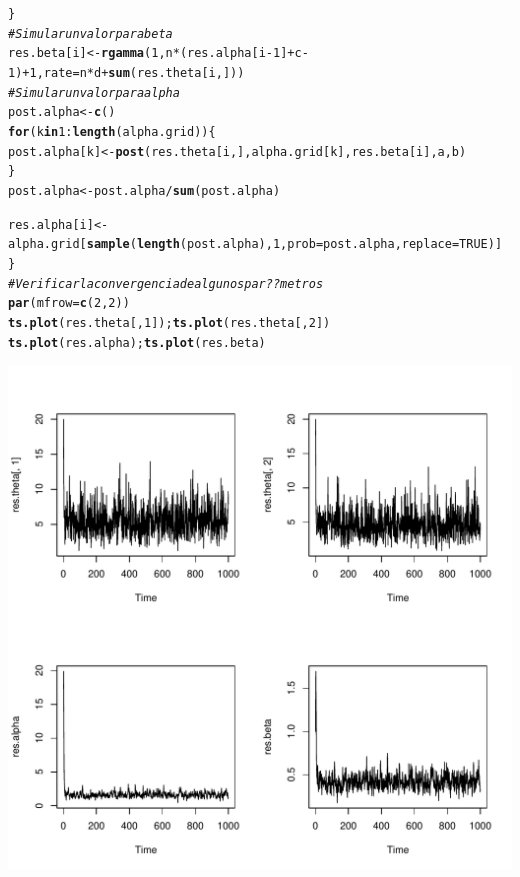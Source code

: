 \documentclass[10pt,openright]{book}\usepackage[]{graphicx}\usepackage[]{color}
\makeatletter
\def\maxwidth{ %
  \ifdim\Gin@nat@width>\linewidth
    \linewidth
  \else
    \Gin@nat@width
  \fi
}
\newcommand{\hlnum}[1]{\textcolor[rgb]{0.686,0.059,0.569}{#1}}%
\newcommand{\hlcom}[1]{\textcolor[rgb]{0.678,0.584,0.686}{\textit{#1}}}%
\newcommand{\hlopt}[1]{\textcolor[rgb]{0,0,0}{#1}}%
\newcommand{\hlstd}[1]{\textcolor[rgb]{0.345,0.345,0.345}{#1}}%
\newcommand{\hlkwa}[1]{\textcolor[rgb]{0.161,0.373,0.58}{\textbf{#1}}}%
\newcommand{\hlkwb}[1]{\textcolor[rgb]{0.69,0.353,0.396}{#1}}%
\newcommand{\hlkwc}[1]{\textcolor[rgb]{0.333,0.667,0.333}{#1}}%
\newcommand{\hlkwd}[1]{\textcolor[rgb]{0.737,0.353,0.396}{\textbf{#1}}}%
\newenvironment{kframe}{%
 \def\at@end@of@kframe{}%
 \ifinner\ifhmode%
  \def\at@end@of@kframe{\end{minipage}}%
  \begin{minipage}{\columnwidth}%
 \fi\fi%
 \def\FrameCommand##1{\hskip\@totalleftmargin \hskip-\fboxsep
 \colorbox{shadecolor}{##1}\hskip-\fboxsep
     \hskip-\linewidth \hskip-\@totalleftmargin \hskip\columnwidth}%
 \MakeFramed {\advance\hsize-\width
   \@totalleftmargin\z@ \linewidth\hsize
   \@setminipage}}%
 {\par\unskip\endMakeFramed%
 \at@end@of@kframe}
\newenvironment{knitrout}{}{} %
\makeatother
\begin{document}
\begin{knitrout}
\begin{kframe}
\begin{alltt}
   \hlstd{\}}
 \hlcom{# Simular un valor para beta}
   \hlstd{res.beta[i]} \hlkwb{<-} \hlkwd{rgamma}\hlstd{(}\hlnum{1}\hlstd{, n}\hlopt{*}\hlstd{(res.alpha[i}\hlopt{-}\hlnum{1}\hlstd{]}\hlopt{+}\hlstd{c}\hlopt{-}\hlnum{1}\hlstd{)}\hlopt{+}\hlnum{1}\hlstd{,} \hlkwc{rate}\hlstd{=n}\hlopt{*}\hlstd{d}\hlopt{+}\hlkwd{sum}\hlstd{(res.theta[i,]))}
 \hlcom{# Simular un valor para alpha}
 \hlstd{post.alpha} \hlkwb{<-} \hlkwd{c}\hlstd{()}
 \hlkwa{for}\hlstd{(k} \hlkwa{in} \hlnum{1}\hlopt{:}\hlkwd{length}\hlstd{(alpha.grid))\{}
  \hlstd{post.alpha[k]} \hlkwb{<-} \hlkwd{post}\hlstd{(res.theta[i,],alpha.grid[k],res.beta[i],a,b)}
 \hlstd{\}}
 \hlstd{post.alpha} \hlkwb{<-} \hlstd{post.alpha}\hlopt{/}\hlkwd{sum}\hlstd{(post.alpha)}

 \hlstd{res.alpha[i]} \hlkwb{<-} \hlstd{alpha.grid[}\hlkwd{sample}\hlstd{(}\hlkwd{length}\hlstd{(post.alpha),} \hlnum{1}\hlstd{,} \hlkwc{prob}\hlstd{=post.alpha,} \hlkwc{replace}\hlstd{=}\hlnum{TRUE}\hlstd{)]}
 \hlstd{\}}
 \hlcom{# Verificar la convergencia de algunos par??metros}
 \hlkwd{par}\hlstd{(}\hlkwc{mfrow}\hlstd{=}\hlkwd{c}\hlstd{(}\hlnum{2}\hlstd{,}\hlnum{2}\hlstd{))}
 \hlkwd{ts.plot}\hlstd{(res.theta[,}\hlnum{1}\hlstd{]);} \hlkwd{ts.plot}\hlstd{(res.theta[,}\hlnum{2}\hlstd{])}
 \hlkwd{ts.plot}\hlstd{(res.alpha);} \hlkwd{ts.plot}\hlstd{(res.beta)}
\end{alltt}
\end{kframe}
\includegraphics[width=\maxwidth]{figure/unnamed-chunk-74-1} 

\end{knitrout}
\end{document}
